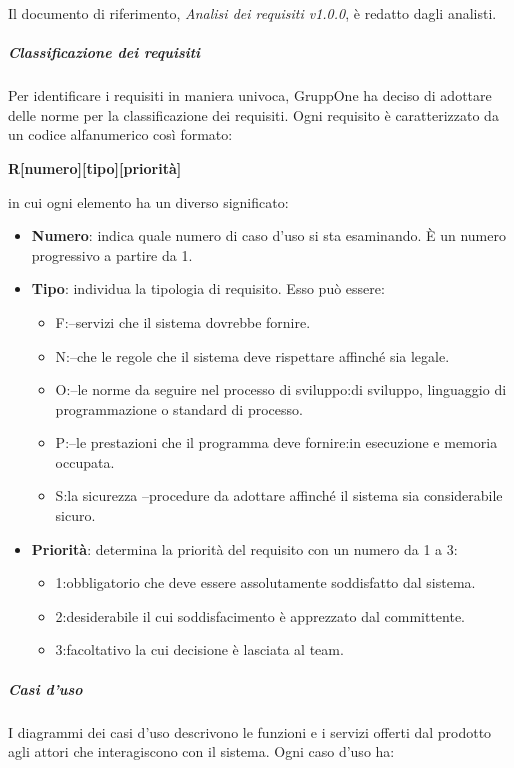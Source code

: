 \documentclass[../norme-di-progetto.tex]{subfiles}
\begin{document}
Il documento di riferimento, \textit{Analisi dei requisiti v1.0.0}, è redatto dagli analisti.

\subparagraph{Classificazione dei requisiti}%
\label{subp:classificazione_dei_requisiti}

Per identificare i requisiti in maniera univoca, GruppOne ha deciso di adottare delle norme per la classificazione dei requisiti.
Ogni requisito è caratterizzato da un codice alfanumerico così formato:
\begin{center}
  \textbf{R[numero][tipo][priorità]}
\end{center}
in cui ogni elemento ha un diverso significato:
\begin{itemize}
  \item \textbf{Numero}: indica quale numero di caso d'uso si sta esaminando. È un numero progressivo a partire da 1.
  \item \textbf{Tipo}: individua la tipologia di requisito. Esso può essere:
        \begin{itemize}
          \item F:\@funzionale --\@indica servizi che il sistema dovrebbe fornire.
          \item N:\@legislativo --\@indica che le regole che il sistema deve rispettare affinché sia legale.
          \item O:\@organizzativo --\@indica le norme da seguire nel processo di sviluppo:\@ambiente di sviluppo, linguaggio di programmazione o standard di processo.
          \item P:\@prestazionale --\@indica le prestazioni che il programma deve fornire: in esecuzione e memoria occupata.
          \item S:\@per la sicurezza --\@indica procedure da adottare affinché il sistema sia considerabile sicuro.
        \end{itemize}
  \item \textbf{Priorità}: determina la priorità del requisito con un numero da 1 a 3:
        \begin{itemize}
          \item 1:\@requisito obbligatorio che deve essere assolutamente soddisfatto dal sistema.
          \item 2:\@requisito desiderabile il cui soddisfacimento è apprezzato dal committente.
          \item 3:\@requisito facoltativo la cui decisione è lasciata al team.
        \end{itemize}
\end{itemize}
\subparagraph{Casi d'uso}%
\label{subp:casi_d'uso}
I diagrammi dei casi d'uso descrivono le funzioni e i servizi offerti dal prodotto agli attori che interagiscono con il sistema. Ogni caso d'uso ha:
\end{document}
